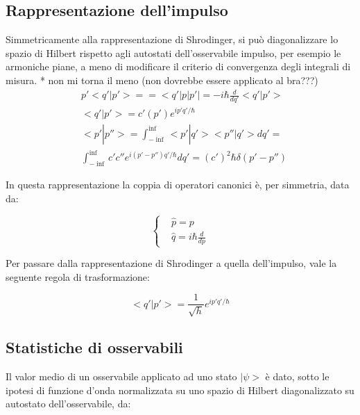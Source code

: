 \documentclass{article}
\begin{document}
\subsection{Rappresentazione dell'impulso}
Simmetricamente alla rappresentazione di Shrodinger, si può diagonalizzare lo spazio di Hilbert rispetto agli autostati dell'osservabile impulso, per
esempio le armoniche piane, a meno di modificare il criterio di convergenza degli integrali di misura.
* non mi torna il meno (non dovrebbe essere applicato al bra???)
\begin{equation}
    \begin{aligned}
         & p'<q'|p'>==<q'|p|p'|=-i\hbar\frac{d}{dq'}<q'|p'>                                \\
         & <q'|p'>=c'(p')e^{ip'q'/\hbar}                                                   \\
         & <p' | p''> = \int_{-\inf}^{\inf} <p' |q'><p''|q'>dq'=                           \\
         & \int_{-\inf}^{\inf} c'c'' e^{i(p'-p'')q'/\hbar}dq'= (c')^2 \hbar \delta(p'-p'')
    \end{aligned}
\end{equation}

In questa rappresentazione la coppia di operatori canonici è, per simmetria, data da:

\begin{equation}
    \left\{
    \begin{aligned}
         & \hat{p}=p                   \\
         & \hat{q}=i\hbar \frac{d}{dp}
    \end{aligned}
    \right.
\end{equation}

Per passare dalla rappresentazione di Shrodinger a quella dell'impulso, vale la seguente regola di trasformazione:

\begin{equation}
    <q'|p'>= \frac{1}{\sqrt{h}}e^{ip'q'/\hbar}
\end{equation}

\subsection{Statistiche di osservabili}
Il valor medio di un osservabile applicato ad uno stato $|\psi>$ è dato, sotto le ipotesi di funzione d'onda normalizzata su uno spazio di Hilbert diagonalizzato su autostato dell'osservabile, da:
\end{document}

